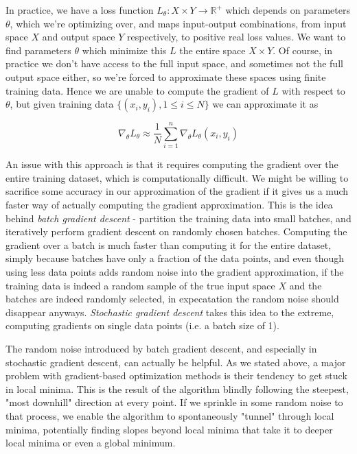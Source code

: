 \documentclass{article}
\begin{document}
In practice, we have a loss function $ L_\theta: X \times Y \rightarrow \mathbb{R}^+ $ which depends on parameters $ \theta $, which we're optimizing over, and maps input-output combinations, from input space $ X $ and output space $ Y $ respectively, to positive real loss values. We want to find parameters $ \theta $ which minimize this $ L $ the entire space $ X \times Y $. Of course, in practice we don't have access to the full input space, and sometimes not the full output space either, so we're forced to approximate these spaces using finite training data. Hence we are unable to compute the gradient of $ L $ with respect to $ \theta $, but given training data $ \{ (x_i, y_i), 1 \leq i \leq N \} $ we can approximate it as 

    $$ \nabla_\theta L_\theta \approx \frac{1}{N} \sum_{i = 1}^n \nabla_\theta L_\theta (x_i, y_i) $$

An issue with this approach is that it requires computing the gradient over the entire training dataset, which is computationally difficult. We might be willing to sacrifice some accuracy in our approximation of the gradient if it gives us a much faster way of actually computing the gradient approximation. This is the idea behind \textit{batch gradient descent} - partition the training data into small batches, and iteratively perform gradient descent on randomly chosen batches. Computing the gradient over a batch is much faster than computing it for the entire dataset, simply because batches have only a fraction of the data points, and even though using less data points adds random noise into the gradient approximation, if the training data is indeed a random sample of the true input space $ X $ and the batches are indeed randomly selected, in expecatation the random noise should disappear anyways. \textit{Stochastic gradient descent} takes this idea to the extreme, computing gradients on single data points (i.e. a batch size of 1).

The random noise introduced by batch gradient descent, and especially in stochastic gradient descent, can actually be helpful. As we stated above, a major problem with gradient-based optimization methods is their tendency to get stuck in local minima. This is the result of the algorithm blindly following the steepest, "most downhill" direction at every point. If we sprinkle in some random noise to that process, we enable the algorithm to spontaneously "tunnel" through local minima, potentially finding slopes beyond local minima that take it to deeper local minima or even a global minimum.
\end{document}

